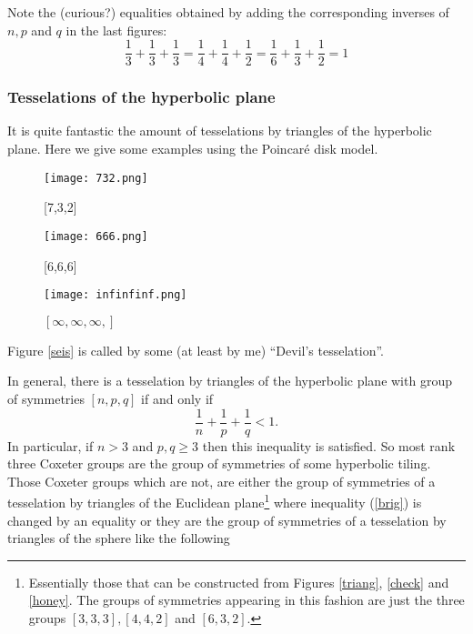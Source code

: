 \documentclass[12pt]{wart}
\theoremstyle{remark}
\begin{document}
Note the (curious?) equalities obtained by adding the corresponding inverses  of $n, p$ and $q$ in the last figures: $$\frac{1}{3}+ \frac{1}{3}+\frac{1}{3}=\frac{1}{4}+ \frac{1}{4}+\frac{1}{2}=\frac{1}{6}+ \frac{1}{3}+\frac{1}{2}=1$$



\subsubsection{Tesselations of the hyperbolic plane}\label{thp}

It is quite fantastic the amount of tesselations  by triangles of the hyperbolic plane. Here we give some examples using the Poincar\'e disk model. 
\begin{figure}[htbp]
\begin{minipage}[t]{0.30\linewidth}
    \texttt{[image: 732.png]}
    \caption{[7,3,2]}
    \label{trian}
\end{minipage}
    \hfill
\begin{minipage}[t]{0.30\linewidth}
    \texttt{[image: 666.png]}
    \caption{ [6,6,6]}
    \label{seis}
\end{minipage} 
   \hfill
\begin{minipage}[t]{0.30\linewidth}
    \texttt{[image: infinfinf.png]}
    \caption{$[\infty,\infty,\infty,]$}
    \label{in}
\end{minipage} 
\end{figure}


Figure \ref{seis} is called by some (at least by me) ``Devil's tesselation''.

In general, there is a tesselation  by triangles of the hyperbolic plane  with group of symmetries $[n,p,q]$  if and only if \begin{equation}\label{brig}\frac{1}{n}+ \frac{1}{p}+\frac{1}{q}<1.\end{equation}
In particular, if  $n>3$ and $p,q\geq 3$ then this inequality is satisfied. So most rank three Coxeter groups are  the group of symmetries of some hyperbolic tiling. Those Coxeter groups which are not, are either the  group of symmetries of a tesselation by triangles of the Euclidean plane\footnote{Essentially those that can be constructed from Figures \ref{triang}, \ref{check} and \ref{honey}. The groups of symmetries appearing in this fashion are just the three groups $[3,3,3], [4,4,2]$ and $[6,3,2]$. } where inequality (\ref{brig}) is changed by an equality or they are the  group of symmetries of a tesselation by triangles of the sphere like the following
\end{document}
